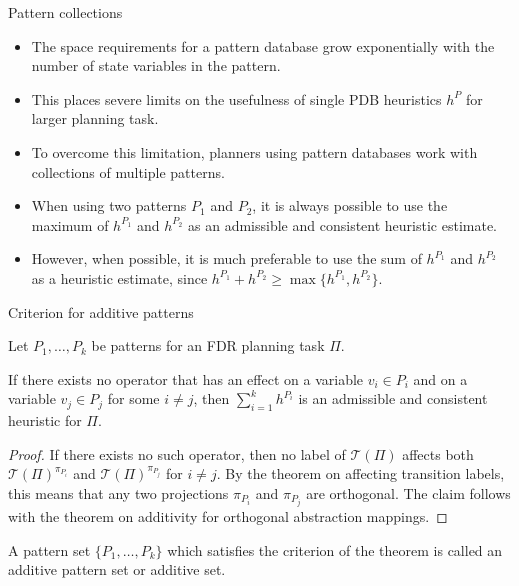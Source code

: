 \documentclass{gkibeamer}
\begin{document}
\begin{frame}{Pattern collections}
  \begin{itemize}
  \item The space requirements for a pattern database grow
    \alert{exponentially} with the \alert{number of state variables}
    in the pattern.
  \item This places severe limits on the usefulness of single PDB
    heuristics $h^P$ for larger planning task.
  \item To overcome this limitation, planners using pattern databases
    work with \alert{collections of multiple patterns}.
  \item When using two patterns $P_1$ and $P_2$, it is always possible
    to use the \alert{maximum} of $h^{P_1}$ and $h^{P_2}$ as an
    admissible and consistent heuristic estimate.
  \item However, when possible, it is much preferable to use
    the \alert{sum} of $h^{P_1}$ and $h^{P_2}$ as a heuristic
    estimate, since $h^{P_1} + h^{P_2} \ge \max \{h^{P_1}, h^{P_2}\}$.
  \end{itemize}
\end{frame}

\begin{frame}{Criterion for additive patterns}
  \begin{theorem}
    Let $P_1, \dots, P_k$ be patterns for an FDR planning task $\Pi$.

    \smallskip

    If there exists no operator that has an effect on a variable $v_i
    \in P_i$ and on a variable $v_j \in P_j$ for some $i \neq j$, then
    $\sum_{i=1}^k h^{P_i}$ is an admissible and consistent heuristic
    for $\Pi$.
  \end{theorem}
  \pause
  \begin{proof}
    If there exists no such operator, then no label of $\mathcal
    T(\Pi)$ affects both $\mathcal T(\Pi)^{\pi_{P_i}}$ and $\mathcal
    T(\Pi)^{\pi_{P_j}}$ for $i \neq j$. By the theorem on affecting
    transition labels, this means that any two projections $\pi_{P_i}$
    and $\pi_{P_j}$ are orthogonal. The claim follows with the theorem
    on additivity for orthogonal abstraction mappings.
  \end{proof}

  A pattern set $\{P_1, \dots, P_k\}$ which satisfies the criterion of
  the theorem is called an \alert{additive pattern set} or
  \alert{additive set}.
\end{frame}
\end{document}
